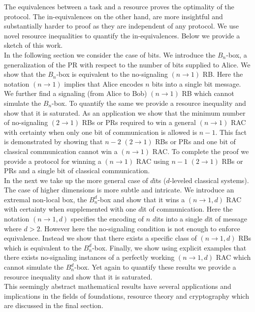 \documentclass[%
 reprint,
 amsmath,amssymb,
 aps,
]{revtex4-1}
\begin{document}
The equivalences between a task and a resource proves the optimality of the protocol. The in-equivalences on the other hand, are more insightful and substantially harder to proof as they are independent of any protocol. We use novel resource inequalities to quantify the in-equivalences. Below we provide a sketch of this work.\\ 
In the following section we consider the case of bits. We introduce the $B_n$-box, a generalization of the PR with respect to the number of bits supplied to Alice. We show that the $B_n$-box is equivalent to the no-signaling $(n\rightarrow 1)$ RB. Here the notation $(n\rightarrow 1)$ implies that Alice encodes $n$ bits into a single bit message. We further find a signaling (from Alice to Bob) $(n\rightarrow 1)$ RB which cannot simulate the $B_n$-box. To quantify the same we provide a resource inequality and show that it is saturated. 
As an application we show that the minimum number of no-signaling $(2\rightarrow 1)$ RBs or PRs required to win a general $(n\rightarrow 1)$ RAC with certainty when only one bit of communication is allowed is $n-1$. This fact is demonstrated by showing that $n-2$  $(2\rightarrow 1)$ RBs or PRs and one bit of classical communication cannot win a $(n\rightarrow 1)$ RAC. To complete the proof we provide a protocol for winning a $(n\rightarrow 1)$ RAC using $n-1$ $(2\rightarrow 1)$ RBs or PRs  and a single bit of classical communication. \\
In the next we take up the more general case of $d$its ($d$-leveled classical systems). The case of higher dimensions is more subtle and intricate. We introduce an extremal non-local box, the $B^d_n$-box and show that it wins a $(n\rightarrow 1,d)$ RAC with certainty when supplemented with one $d$it of communication. Here the notation $(n\rightarrow 1,d)$ specifies the encoding of $n$ $d$its into a single $d$it of message where $d>2$.  However here the no-signaling condition is not enough to enforce equivalence. Instead we show that there exists a specific class of $(n\rightarrow 1,d)$ RBs which is equivalent to the $B^d_n$-box. Finally, we show using explicit examples that there exists no-signaling instances of a perfectly working $(n\rightarrow 1,d)$ RAC which cannot simulate the $B^d_n$-box. Yet again to quantify these results we provide a resource inequality and show that it is saturated. \\
This seemingly abstract mathematical results have several applications and implications in the fields of foundations, resource theory and cryptography which are discussed in the final section.
\end{document}

